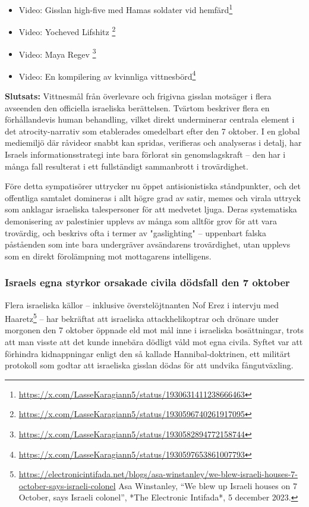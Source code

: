 \begin{itemize}
\item Video: Gisslan high-five med Hamas soldater vid hemfärd\footnote{\url{https://x.com/LasseKaragiann5/status/1930631411238666463}}
\item Video: Yocheved Lifshitz \footnote{\url{https://x.com/LasseKaragiann5/status/1930596740261917095}}
\item Video: Maya Regev \footnote{\url{https://x.com/LasseKaragiann5/status/1930582894772158744}}
\item Video: En kompilering av kvinnliga vittnesbörd\footnote{\url{https://x.com/LasseKaragiann5/status/1930597653861007793}}
\end{itemize}

\textbf{Slutsats:} Vittnesmål från överlevare och frigivna gisslan motsäger i flera avseenden den officiella israeliska berättelsen. Tvärtom beskriver flera en förhållandevis human behandling, vilket direkt underminerar centrala element i det atrocity-narrativ som etablerades omedelbart efter den 7 oktober. I en global mediemiljö där råvideor snabbt kan spridas, verifieras och analyseras i detalj, har Israels informationsstrategi inte bara förlorat sin genomslagskraft – den har i många fall resulterat i ett fullständigt sammanbrott i trovärdighet.

Före detta sympatisörer uttrycker nu öppet antisionistiska ståndpunkter, och det offentliga samtalet domineras i allt högre grad av satir, memes och virala uttryck som anklagar israeliska talespersoner för att medvetet ljuga. Deras systematiska demonisering av palestinier upplevs av många som alltför grov för att vara trovärdig, och beskrivs ofta i termer av "gaslighting" – uppenbart falska påståenden som inte bara undergräver avsändarens trovärdighet, utan upplevs som en direkt förolämpning mot mottagarens intelligens.




\subsubsection*{Israels egna styrkor orsakade civila dödsfall den 7 oktober}

Flera israeliska källor – inklusive överstelöjtnanten Nof Erez i intervju med Haaretz\footnote{\url{https://electronicintifada.net/blogs/asa-winstanley/we-blew-israeli-houses-7-october-says-israeli-colonel} Asa Winstanley, “We blew up Israeli houses on 7 October, says Israeli colonel”, *The Electronic Intifada*, 5 december 2023.}
 – har bekräftat att israeliska attackhelikoptrar och drönare under morgonen den 7 oktober öppnade eld mot mål inne i israeliska bosättningar, trots att man visste att det kunde innebära dödligt våld mot egna civila. Syftet var att förhindra kidnappningar enligt den så kallade Hannibal-doktrinen, ett militärt protokoll som godtar att israeliska gisslan dödas för att undvika fångutväxling.

